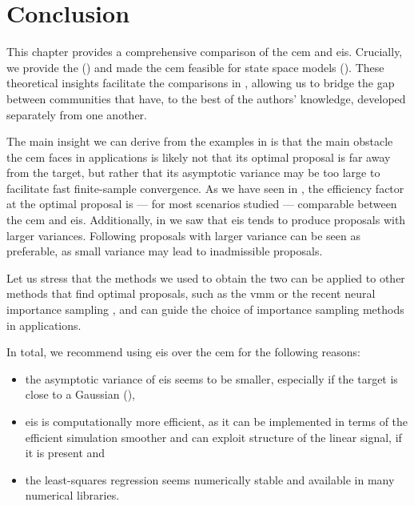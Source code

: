 \section{Conclusion}
\label{sec:03_conclusion}

This chapter provides a comprehensive comparison of the \acrshort{cem} and \acrshort{eis}. Crucially, we provide the   () and made the \acrshort{cem} feasible for state space models (). These theoretical insights facilitate the comparisons in , allowing us to bridge the gap between communities that have, to the best of the authors' knowledge, developed separately from one another.

The main insight we can derive from the examples in  is that the main obstacle the \acrshort{cem} faces in applications is likely not that its optimal proposal is far away from the target, but rather that its asymptotic variance may be too large to facilitate fast finite-sample convergence. As we have seen in , the efficiency factor at the optimal proposal is --- for most scenarios studied --- comparable between the \acrshort{cem} and \acrshort{eis}. Additionally, in  we saw that \acrshort{eis} tends to produce proposals with larger variances. Following  proposals with larger variance can be seen as preferable, as small variance may lead to inadmissible proposals.

Let us stress that the methods we used to obtain the two  can be applied to other methods that find optimal proposals, such as the \acrshort{vmm} or the recent neural importance sampling \citep{Muller2019Neural}, and can guide the choice of importance sampling methods in applications.

In total, we recommend using \acrshort{eis} over the \acrshort{cem} for the following reasons:
\begin{itemize}
    \item the asymptotic variance of \acrshort{eis} seems to be smaller, especially if the target is close to a Gaussian (),
    \item \acrshort{eis} is computationally more efficient, as it can be implemented in terms of the efficient simulation smoother and can exploit structure of the linear signal, if it is present and
    \item the least-squares regression seems numerically stable and available in many numerical libraries.
\end{itemize}